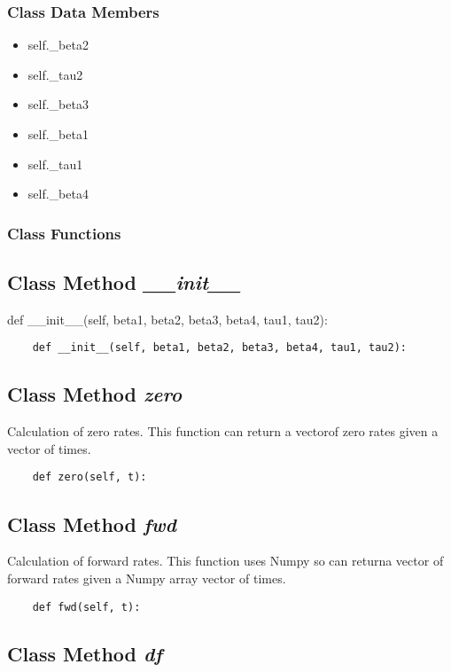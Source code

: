 \documentclass[twoside,11pt]{book}
\begin{document}
\subsubsection{Class Data Members}
\begin{itemize}
\item{self.\_beta2}
\item{self.\_tau2}
\item{self.\_beta3}
\item{self.\_beta1}
\item{self.\_tau1}
\item{self.\_beta4}
\end{itemize}

\subsubsection{Class Functions}

\subsection{Class Method {\it \_\_init\_\_}}
def \_\_init\_\_(self, beta1, beta2, beta3, beta4, tau1, tau2):

\begin{lstlisting}
    def __init__(self, beta1, beta2, beta3, beta4, tau1, tau2):
\end{lstlisting}

\subsection{Class Method {\it zero}}
Calculation of zero rates. This function can return a vectorof zero rates given a vector of times. 

\begin{lstlisting}
    def zero(self, t):
\end{lstlisting}

\subsection{Class Method {\it fwd}}
Calculation of forward rates. This function uses Numpy so can returna vector of forward rates given a Numpy array vector of times. 

\begin{lstlisting}
    def fwd(self, t):
\end{lstlisting}

\subsection{Class Method {\it df}}
\end{document}
